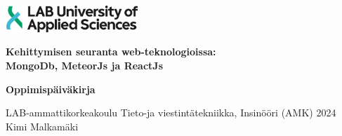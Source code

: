 \documentclass[11pt,a4paper,titlepage,oneside]{article}
\renewcommand{\baselinestretch}{1.5}
\begin{document}
\pagestyle{empty}



\includegraphics[width=5cm,height=1cm]{./src/labimg.jpg}

\renewcommand{\baselinestretch}{1} 
\setlength{\parskip}{0cm}

\vspace{86mm}
{\huge
\textbf{Kehittymisen seuranta web-teknologioissa:\\ MongoDb, MeteorJs ja ReactJs}
}
\newline

{\large

\vspace{5mm}
\textbf{Oppimispäiväkirja}
}

\vspace{80mm}

LAB-ammattikorkeakoulu \newline
\vspace{2mm}
Tieto-ja viestintätekniikka, Insinööri (AMK) \newline
\vspace{2mm}
2024 \newline
\vspace{2mm}
Kimi Malkamäki

\newpage






\begin{spacing}{1} %
    \setlength{\parskip}{0.5cm} 
    
\end{spacing}



\newpage




\setcounter{page}{0}
\pagestyle{empty}

\tableofcontents





\newpage



\end{document}
